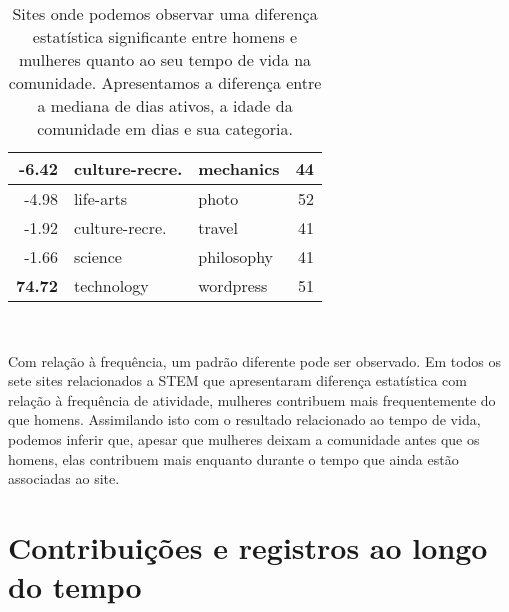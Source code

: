 \begin{table}[h]
\begin{tabular}{@{}rllr@{}}
-6.42                             & culture-recre. & mechanics          & 44                 \\ \midrule
-4.98                             & life-arts          & photo              & 52                 \\ \midrule
-1.92                             & culture-recre. & travel             & 41                 \\ \midrule
-1.66                             & science            & philosophy         & 41                 \\ \midrule
\textbf{74.72}                             & technology         & wordpress          & 51                 \\ \bottomrule
\end{tabular}
\caption[Diferença de tempo de vida entre homens e mulheres]{Sites onde podemos observar uma diferença estatística significante entre homens e mulheres quanto ao seu tempo de vida na comunidade. Apresentamos a diferença entre a mediana de dias ativos, a idade da comunidade em dias e sua categoria.}~\label{table:lifetime}
\end{table}


Com relação à frequência, um padrão diferente pode ser observado. Em todos os sete sites relacionados a STEM que apresentaram diferença estatística com relação à frequência de atividade, mulheres contribuem mais frequentemente do que homens. Assimilando isto com o resultado relacionado ao tempo de vida, podemos inferir que, apesar que mulheres deixam a comunidade antes que os homens, elas contribuem mais enquanto durante o tempo que ainda estão associadas ao site.


\section{Contribuições e registros ao longo do tempo}

